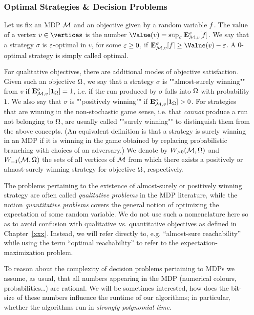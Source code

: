 \subsubsection*{Optimal Strategies \& Decision Problems}

Let us fix an MDP $\mathcal{M}$ and an objective given by a random variable 
$f$. The value of a vertex $v\in\vertices$ is the number 
$\Value(v)=\sup_{\sigma} \expv^{\sigma}_{\mdp,v}[\quantObj]$. We say that a strategy $\sigma$ is $\varepsilon$-optimal in $v$, for some $\varepsilon\geq 0$, if $\expv^{\sigma}_{\mdp,v}[\quantObj] \geq \Value(v) - \eps$. A $0$-optimal strategy is simply called optimal. 

For qualitative objectives, there are additional modes of objective satisfaction. Given such an objective $\Omega$, we say that a strategy $\sigma$ is ""almost-surely winning"" from $v$ if $\mathbf{E}^{\sigma}_{\mathcal{M},v}[\mathbf{1}_{\Omega}]=1$, i.e. if the run produced by $\sigma$ falls into $\Omega$ with probability $1$. We also say that $\sigma$ is ""positively winning"" if $\mathbf{E}^{\sigma}_{\mathcal{M},v}[\mathbf{1}_{\Omega}]>0$. For strategies that are winning in the non-stochastic game sense, i.e. that \emph{cannot} produce a run not belonging to $\Omega$, are usually called ""surely winning"" to distinguish them from the above concepts. (An equivalent definition is that a strategy is surely winning in an MDP if it is winning in the game obtained by replacing probabilistic branching with choices of an adversary.) We denote by $W_{>0}(\mathcal{M},\Omega)$ and $W_{=1}(\mathcal{M},\Omega)$ the sets of all vertices of $\mathcal{M}$ from which there exists a positively or almost-surely winning strategy for objective $\Omega$, respectively.

The problems pertaining to the existence of almost-surely or positively winning strategy are often called \emph{qualitative problems} in the MDP literature, while the notion \emph{quantitative problems} covers the general notion of optimizing the expectation of some random variable. We do not use such a nomenclature here so as to avoid confusion with qualitative vs. quantitative objectives as defined in Chapter~\ref{xxx}. Instead, we will refer directly to, e.g. ``almost-sure reachability'' while using the term ``optimal reachability'' to refer to the expectation-maximization problem.

To reason about the complexity of decision problems pertaining to MDPs we assume, as usual, that all numbers appearing in the MDP (numerical colours, probabilities\ldots) are rational. We will be sometimes interested, how does the bit-size of these numbers influence the runtime of our algorithms; in particular, whether the algorithms run in \emph{strongly polynomial time.}

